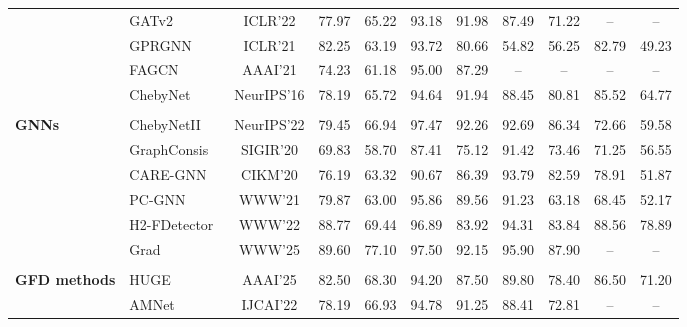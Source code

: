 \documentclass[10pt,journal]{IEEEtran}
\newcommand{\na}{--}
\begin{document}
\begin{table}[!t]
\begin{tabular}{
>{\centering\arraybackslash}m{1.78cm}
l
c
*{8}{c}
}
& GATv2~\cite{brody2022gatv2} & ICLR'22 &
77.97 & 65.22 &
93.18 & 91.98 &
87.49 & 71.22 &
\na & \na \\

& GPRGNN~\cite{chien2021gprgnn} & ICLR'21 &
82.25 & 63.19 &
93.72 & 80.66 &
54.82 & 56.25 &
82.79 & 49.23 \\

& FAGCN~\cite{bo2021fagcn} & AAAI'21 &
74.23 & 61.18 &
95.00 & 87.29 &
\na & \na &
\na & \na \\

& ChebyNet~\cite{defferrard2016chebnet} & NeurIPS'16 &
78.19 & 65.72 &
94.64 & 91.94 &
88.45 & 80.81 &
85.52 & 64.77 \\
\multirow{-8}{=}{\makecell[c]{\textbf{General}\\\textbf{GNNs}}}
& ChebyNetII~\cite{he2022chebnetii} & NeurIPS'22 &
79.45 & 66.94 &
97.47 & 92.26 &
92.69 & 86.34 &
72.66 & 59.58 \\

\midrule

& GraphConsis~\cite{liu2020graphconsis} & SIGIR'20 &
69.83 & 58.70 &
87.41 & 75.12 &
91.42 & 73.46 &
71.25 & 56.55 \\

& CARE-GNN~\cite{dou2020caregnn} & CIKM'20 &
76.19 & 63.32 &
90.67 & 86.39 &
93.79 & 82.59 &
78.91 & 51.87 \\

& PC-GNN~\cite{liu2021pcgnn} & WWW'21 &
79.87 & 63.00 &
95.86 & 89.56 &
91.23 & 63.18 &
68.45 & 52.17 \\

& H2-FDetector~\cite{shi2022h2fdetector} & WWW'22 &
88.77 & 69.44 &
96.89 & 83.92 &
94.31 & 83.84 &
88.56 & 78.89 \\

& Grad~\cite{yang2025grad} & WWW'25 &
89.60 & 77.10 &
97.50 & 92.15 &
95.90 & 87.90 &
\na & \na \\
\multirow{-6}{=}{\makecell[c]{\textbf{Structure-aware}\\
                             \textbf{GFD methods}}}
& HUGE~\cite{pan2025huge} & AAAI'25 &
82.50 & 68.30 &
94.20 & 87.50 &
89.80 & 78.40 &
86.50 & 71.20 \\

\midrule

& AMNet~\cite{chai2022amnet} & IJCAI'22 &
78.19 & 66.93 &
94.78 & 91.25 &
88.41 & 72.81 &
\na & \na \\


\end{tabular}
\end{table}
\end{document}
